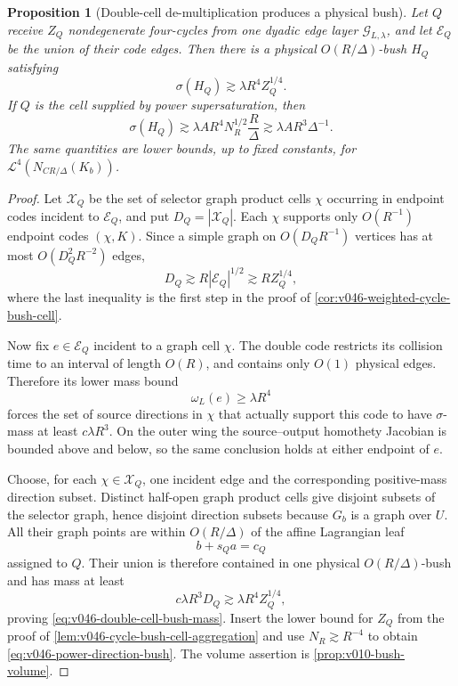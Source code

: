\documentclass[10pt]{article}
\newtheorem{proposition}[theorem]{Proposition}
\begin{document}
\begin{proposition}[Double-cell de-multiplication produces a physical bush]
\label{prop:v046-double-cell-demultiplication}
Let \(Q\) receive \(Z_Q\) nondegenerate four-cycles from one dyadic edge layer
\(\mathscr G_{L,\lambda}\), and let \(\mathscr E_Q\) be the union of their code edges.  Then there is
a physical \(O(R/\Delta)\)-bush \(H_Q\) satisfying
\begin{equation}
\label{eq:v046-double-cell-bush-mass}
\boxed{
\sigma(H_Q)
\gtrsim
\lambda R^4 Z_Q^{1/4}.
}
\end{equation}
If \(Q\) is the cell supplied by power supersaturation, then
\begin{equation}
\label{eq:v046-power-direction-bush}
\boxed{
\sigma(H_Q)
\gtrsim
\lambda A R^4N_R^{1/2}\frac{R}{\Delta}
\gtrsim
\lambda A R^3\Delta^{-1}.
}
\end{equation}
The same quantities are lower bounds, up to fixed constants, for
\(\mathcal L^4(N_{CR/\Delta}(K_b))\).
\end{proposition}

\begin{proof}
Let \(\mathscr X_Q\) be the set of selector graph product cells \(\chi\) occurring in endpoint
codes incident to \(\mathscr E_Q\), and put \(D_Q=|\mathscr X_Q|\).  Each \(\chi\) supports only
\(O(R^{-1})\) endpoint codes \((\chi,K)\).  Since a simple graph on
\(O(D_QR^{-1})\) vertices has at most \(O(D_Q^2R^{-2})\) edges,
\[
D_Q
\gtrsim
R|\mathscr E_Q|^{1/2}
\gtrsim
RZ_Q^{1/4},
\]
where the last inequality is the first step in the proof of
\cref{cor:v046-weighted-cycle-bush-cell}.

Now fix \(e\in\mathscr E_Q\) incident to a graph cell \(\chi\).  The double code restricts its
collision time to an interval of length \(O(R)\), and contains only \(O(1)\) physical edges.
Therefore its lower mass bound
\[
\omega_L(e)\ge\lambda R^4
\]
forces the set of source directions in \(\chi\) that actually support this code to have
\(\sigma\)-mass at least \(c\lambda R^3\).  On the outer wing the source--output homothety
Jacobian is bounded above and below, so the same conclusion holds at either endpoint of \(e\).

Choose, for each \(\chi\in\mathscr X_Q\), one incident edge and the corresponding positive-mass
direction subset.  Distinct half-open graph product cells give disjoint subsets of the selector
graph, hence disjoint direction subsets because \(G_b\) is a graph over \(U\).  All their graph
points are within \(O(R/\Delta)\) of the affine Lagrangian leaf
\[
b+s_Qa=c_Q
\]
assigned to \(Q\).  Their union is therefore contained in one physical
\(O(R/\Delta)\)-bush and has mass at least
\[
c\lambda R^3D_Q
\gtrsim
\lambda R^4Z_Q^{1/4},
\]
proving \eqref{eq:v046-double-cell-bush-mass}.  Insert the lower bound for \(Z_Q\) from the proof of
\cref{lem:v046-cycle-bush-cell-aggregation} and use \(N_R\gtrsim R^{-4}\) to obtain
\eqref{eq:v046-power-direction-bush}.  The volume assertion is
\cref{prop:v010-bush-volume}.
\end{proof}
\end{document}
